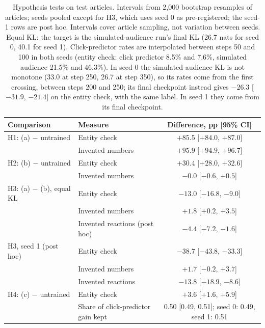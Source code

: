 \begin{table}[h]
\centering\small
\begin{tabular}{@{}llc@{}}
\toprule
Comparison & Measure & Difference, pp [95\% CI] \\
\midrule
H1: (a) $-$ untrained & Entity check & $+85.5$ [$+84.0$, $+87.0$] \\
 & Invented numbers & $+95.9$ [$+94.9$, $+96.7$] \\
H2: (b) $-$ untrained & Entity check & $+30.4$ [$+28.0$, $+32.6$] \\
 & Invented numbers & $-0.0$ [$-0.6$, $+0.5$] \\
H3: (a) $-$ (b), equal KL & Entity check & $-13.0$ [$-16.8$, $-9.0$] \\
 & Invented numbers & $+1.8$ [$+0.2$, $+3.5$] \\
 & Invented reactions (post hoc) & $-4.4$ [$-7.2$, $-1.6$] \\
H3, seed 1 (post hoc) & Entity check & $-38.7$ [$-43.8$, $-33.3$] \\
 & Invented numbers & $+1.7$ [$-0.2$, $+3.7$] \\
 & Invented reactions & $-13.8$ [$-18.9$, $-8.6$] \\
H4: (c) $-$ untrained & Entity check & $+3.6$ [$+1.6$, $+5.9$] \\
 & Share of click-predictor gain kept & 0.50 [0.49, 0.51]; seed 0: 0.49, seed 1: 0.51 \\
\bottomrule
\end{tabular}
\caption{Hypothesis tests on test articles. Intervals from 2,000 bootstrap resamples of articles; seeds pooled except for H3, which uses seed 0 as pre-registered; the seed-1 rows are post hoc. Intervals cover article sampling, not variation between seeds. Equal KL: the target is the simulated-audience run's final KL (26.7 nats for seed 0, 40.1 for seed 1). Click-predictor rates are interpolated between steps 50 and 100 in both seeds (entity check: click predictor 8.5\% and 7.6\%, simulated audience 21.5\% and 46.3\%). In seed 0 the simulated-audience KL is not monotone (33.0 at step 250, 26.7 at step 350), so its rates come from the first crossing, between steps 200 and 250; its final checkpoint instead gives $-26.3$ [$-31.9$, $-21.4$] on the entity check, with the same label. In seed 1 they come from its final checkpoint.}
\label{tab:tests}
\end{table}
\FloatBarrier
